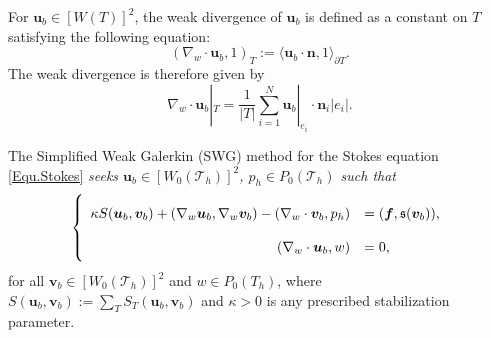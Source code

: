 \documentclass[final,leqno]{siamltex704}
\def\S{{\mathfrak s}}
\def\T{{\mathcal T}}
\begin{document}
For $\bm{u}_b \in [W(T)]^2$, the weak divergence of $\bm{u}_b$ is defined as a constant on $T$ satisfying the following equation:
\begin{equation}\label{equ.weak.divergence}
(\nabla_w \cdot \bm{u}_b,1)_T :=  \langle\bm{u}_b\cdot \bm{n}, 1\rangle_{\partial T}.
\end{equation}
The weak divergence is therefore given by
\begin{equation}\label{equ.weak.divergence.new}
\nabla_w \cdot \bm{u}_b|_T =  \frac{1}{|T|}\sum_{i=1}^N \bm{u}_b|_{e_i}\cdot \bm{n}_i |e_i|.
\end{equation}

The Simplified Weak Galerkin (SWG) method for the Stokes equation \eqref{Equ.Stokes} {\em
seeks $\bm{u}_b \in [W_0(\T_h)]^2$, $p_h \in {P}_0 (\T_h)$ such that}
\begin{equation}\label{equ.Stokes-FD-SWG}
\left\{
\renewcommand\arraystretch{2}
\begin{array}{rl}
\kappa S(\bm{u}_b,\bm{v}_b) + (\nabla_w \bm{u}_b, \nabla_w \bm{v}_b ) -(\nabla_w\cdot \bm{v}_b,p_h)&=(\bm{f}, \S(\bm{v}_b)),\\%
(\nabla_w\cdot \bm{u}_b,w)&=0,%
\end{array}
\right.
\end{equation}
for all $\bm{v}_b\in [W_0(\T_h)]^2 $ and $w \in {P}_0 (T_h)$, where $S(\bm{u}_b,\bm{v}_b):=\sum_{T}S_T(\bm{u}_b,\bm{v}_b)$ and $\kappa>0$ is any prescribed stabilization parameter.
\end{document}
